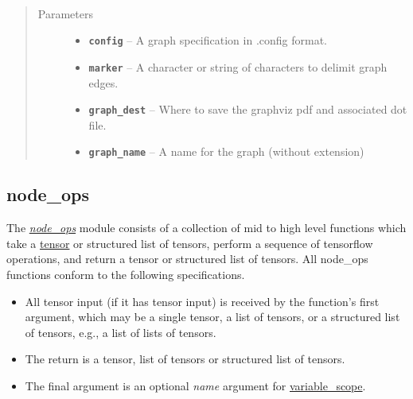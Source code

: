 \documentclass[letterpaper,10pt,english]{sphinxmanual}
\begin{document}
\begin{fulllineitems}
\label{config:config.testGraph}~\begin{quote}\begin{description}
\item[{Parameters}] \leavevmode\begin{itemize}
\item {} 
\textbf{\texttt{config}} -- A graph specification in .config format.

\item {} 
\textbf{\texttt{marker}} -- A character or string of characters to delimit graph edges.

\item {} 
\textbf{\texttt{graph\_dest}} -- Where to save the graphviz pdf and associated dot file.

\item {} 
\textbf{\texttt{graph\_name}} -- A name for the graph (without extension)

\end{itemize}

\end{description}\end{quote}

\end{fulllineitems}



\subsection{node\_ops}
\label{node_ops::doc}\label{node_ops:tensor-decompositions-and-applications}\label{node_ops:node-ops}
The {\hyperref[node_ops::doc]{\emph{\emph{node\_ops}}}} module consists of a collection of mid to high level functions which take a \href{https://www.tensorflow.org/versions/r0.7/api\_docs/python/framework.html\#Tensor}{tensor} or structured list of tensors, perform a sequence of tensorflow operations, and return a tensor or structured list of tensors. All node\_ops functions conform to
the following specifications.
\begin{itemize}
\item {} 
All tensor input (if it has tensor input) is received by the function's first argument, which may be a single tensor, a list of tensors, or a structured list of tensors, e.g., a list of lists of tensors.

\item {} 
The return is a tensor, list of tensors or structured list of tensors.

\item {} 
The final argument is an optional \emph{name} argument for \href{https://www.tensorflow.org/versions/r0.7/how\_tos/variable\_scope/index.html}{variable\_scope}.

\end{itemize}
\end{document}
